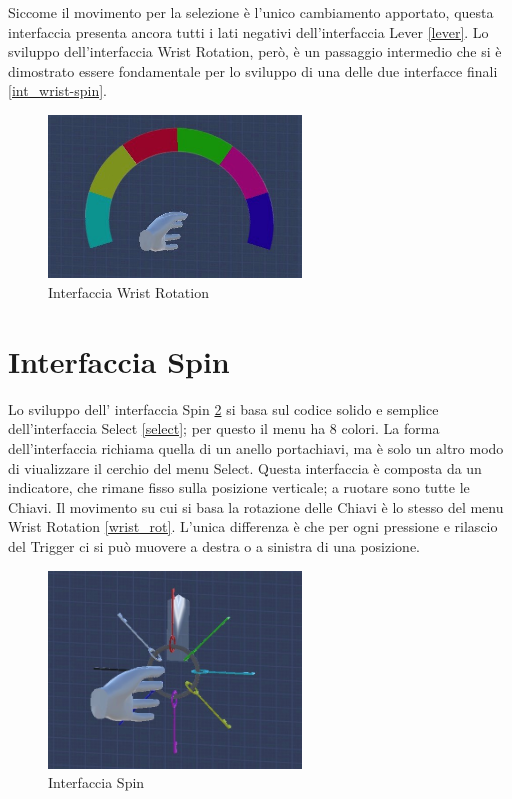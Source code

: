 \documentclass[target=bach,aauheader=]{thud}
\begin{document}
Siccome il movimento per la selezione è l'unico cambiamento apportato, questa interfaccia presenta ancora tutti i lati negativi dell'interfaccia Lever \ref{lever}.
Lo sviluppo dell'interfaccia Wrist Rotation, però, è un passaggio intermedio che si è dimostrato essere fondamentale per lo sviluppo di una delle due interfacce finali \ref{int_wrist-spin}.

\begin{figure}[h]
    \centering
    \includegraphics[width=0.60\textwidth]{wrist_rot}
    \caption{Interfaccia Wrist Rotation}
    \label{fig:wrist_rot}
\end{figure}

\section{Interfaccia Spin} %
\label{spin}
Lo sviluppo dell' interfaccia Spin \ref{fig:spin} si basa sul codice solido e semplice dell'interfaccia Select \ref{select}; per questo il menu ha 8 colori.
La forma dell'interfaccia richiama quella di un anello portachiavi, ma è solo un altro modo di viualizzare il cerchio del menu Select.
Questa interfaccia è composta da un indicatore, che rimane fisso sulla posizione verticale; a ruotare sono tutte le Chiavi.
Il movimento su cui si basa la rotazione delle Chiavi è lo stesso del menu Wrist Rotation \ref{wrist_rot}.
L'unica differenza è che per ogni pressione e rilascio del Trigger ci si può muovere a destra o a sinistra di una posizione. \\

\begin{figure}[h]
    \centering
    \includegraphics[width=0.60\textwidth]{spin}
    \caption{Interfaccia Spin}
    \label{fig:spin}
\end{figure}
\end{document}
